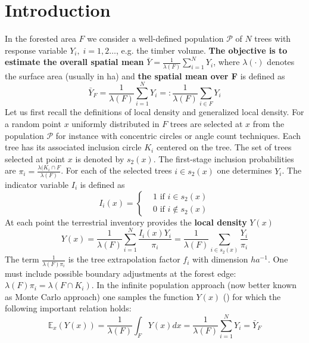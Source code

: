\documentclass[a4paper,12pt,leqno, titlepage]{article}
\newcommand{\EX}{\mathbb{E}}
\begin{document}
\section{Introduction}\label{intro}
In the forested area $F$ we consider a well-defined population $ \mathcal{P}$ of $N$ trees with response variable $Y_i,\;i=1,2 \ldots$, e.g. the timber volume.  \textbf{The objective is to estimate the overall spatial mean}  $\bar{Y}=\frac{1}{\lambda(F)}\sum_{i=1}^NY_i$, where $\lambda(\cdot)$ denotes the surface area (usually in ha) and \textbf{the spatial mean over F} is defined as
 \begin{equation}\label{small1}
 \bar{Y}_F=\frac{1}{\lambda(F)}\sum_{i=1}^N Y_i=:\frac{1}{\lambda(F)}\sum_{i\in{F}}Y_i
 \end{equation}
Let us first recall the definitions of local density and generalized local density.
For a random point $x$  uniformly distributed in $F$ trees are selected at $x$ from the population $\mathcal{P}$ for instance with concentric circles or angle count techniques. Each tree has its associated inclusion circle $K_i$ centered on the tree. The
set of trees selected at point $x$ is denoted by $s_{2}(x)$. The first-stage inclusion probabilities are $\pi_i=\frac{\lambda(K_i\cap F}{\lambda(F)}$. For each of the
selected trees $i\in{s_{2}(x)}$ one determines $Y_i$. The indicator variable $I_i$ is defined as
\begin{equation}\label{1stage}
 I_i(x)=\begin{cases}&1 \text{ if $i\in s_{2}(x)$}\\
                      &0 \text{ if $i\not\in s_{2}(x)$}
         \end{cases}
\end{equation}
At each point  the
terrestrial inventory provides the \textbf{local density} $Y(x)$
\begin{equation}\label{truelocaldensity}
 Y(x) =\frac{1}{\lambda(F)}\sum_{i=1}^N \frac{I_i(x)Y_i}{\pi_i}=\frac{1}{\lambda(F)}\sum_{i\in{s}_2(x)} \frac{Y_i}{\pi_i}
 \end{equation}
 The term $\frac{1}{\lambda(F)\pi_i}$ is the tree extrapolation factor $f_i$ with dimension $ha^{-1}$. One must include possible boundary adjustments at the forest edge: $\lambda(F)\pi_i=\lambda(F \cap K_i)$. In the infinite population approach (now better known as Monte Carlo approach) one samples the function $Y(x)$ (\cite{mandallaz}) for which the following important relation holds:
 \begin{equation}\label{montecarlo}
 \EX_{x} (Y(x))=\frac{1}{\lambda(F)}\int_{F} Y(x)dx=\frac{1}{\lambda(F)}\sum_{i=1}^NY_i=\bar{Y}_F
 \end{equation}
\end{document}
